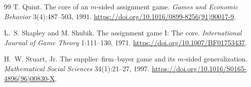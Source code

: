 \documentclass[11pt]{article}
\theoremstyle{remark}
\begin{document}
\begin{thebibliography}{99}
T. Quint. The core of an $m$-sided assignment game.
\emph{Games and Economic Behavior} 3(4):487--503, 1991.
\href{https://doi.org/10.1016/0899-8256(91)90017-9}{https://doi.org/10.1016/0899-8256(91)90017-9}.

L.~S. Shapley and M. Shubik.
The assignment game I: The core.
\emph{International Journal of Game Theory} 1:111--130, 1971.
\href{https://doi.org/10.1007/BF01753437}{https://doi.org/10.1007/BF01753437}.

H.~W. Stuart, Jr. The supplier--firm--buyer game and its $m$-sided generalization.
\emph{Mathematical Social Sciences} 34(1):21--27, 1997.
\href{https://doi.org/10.1016/S0165-4896(96)00830-X}{https://doi.org/10.1016/S0165-4896(96)00830-X}.
\end{thebibliography}
\end{document}
